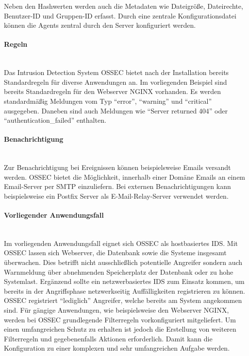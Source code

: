 \noindent Neben den Hashwerten werden auch die Metadaten wie Dateigröße, Dateirechte, Benutzer-ID und Gruppen-ID erfasst. Durch eine zentrale Konfigurationsdatei können die Agents zentral durch den Server konfiguriert werden. 

\paragraph{Regeln}
\noindent \\Das Intrusion Detection System OSSEC bietet nach der Installation bereits Standardregeln für diverse Anwendungen an. Im vorliegenden Beispiel sind bereits Standardregeln für den Webserver NGINX vorhanden. Es werden standardmäßig Meldungen vom Typ "`error"', "`warning"' und "`critical"' ausgegeben. Daneben sind auch Meldungen wie "`Server returned 404"' oder "`authentication\_failed"' enthalten. 

\paragraph{Benachrichtigung}
\noindent \\Zur Benachrichtigung bei Ereignissen können beispielsweise Emails versandt werden. OSSEC bietet die Möglichkeit, innerhalb einer Domäne Emails an einem Email-Server per SMTP einzuliefern. Bei externen Benachrichtigungen kann beispielsweise ein Postfix Server als E-Mail-Relay-Server verwendet werden.  

\paragraph{Vorliegender Anwendungsfall}
\noindent \\Im vorliegenden Anwendungsfall eignet sich OSSEC als hostbasiertes IDS. Mit OSSEC lassen sich Webserver, die Datenbank sowie die Systeme insgesamt überwachen. Dies betrifft nicht ausschließlich potentielle Angreifer sondern auch Warnmeldung über abnehmenden Speicherplatz der Datenbank oder zu hohe Systemlast. Ergänzend sollte ein netzwerbasiertes IDS zum Einsatz kommen, um bereits in der Angriffsphase netzwerkseitig Auffälligkeiten registrieren zu können. OSSEC registriert "`lediglich"' Angreifer, welche bereits am System angekommen sind. Für gängige Anwendungen, wie beispielsweise den Webserver NGINX, werden bei OSSEC grundlegende Filterregeln vorkonfiguriert mitgeliefert. Um einen umfangreichen Schutz zu erhalten ist jedoch die Erstellung von weiteren Filterregeln und gegebenenfalls Aktionen erforderlich. Damit kann die Konfiguration zu einer komplexen und sehr umfangreichen Aufgabe werden. 

